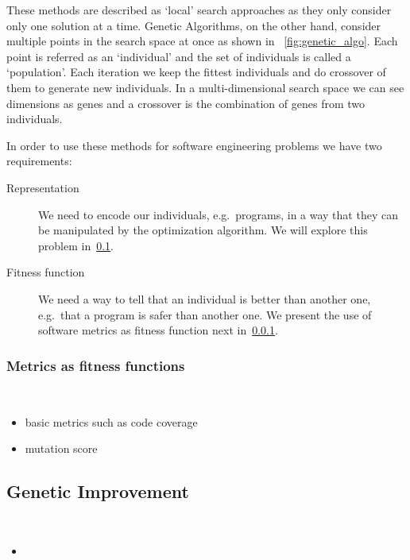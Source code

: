 \documentclass[11pt]{sdm}
\newcommand{\todo}[1]{\colorbox{Red!75}{\textcolor{white}{\textbf{TODO\ifx&#1&\else: #1\fi}}}}
\begin{document}
These methods are described as `local' search approaches as they only consider only one solution at a time.
Genetic Algorithms, on the other hand, consider multiple points in the search space at once as shown in \figurename~\ref{fig:genetic_algo}.
Each point is referred as an `individual' and the set of individuals is called a `population'.
Each iteration we keep the fittest individuals and do crossover of them to generate new individuals.
In a multi-dimensional search space we can see dimensions as genes and a crossover is the combination of genes from two individuals.

In order to use these methods for software engineering problems we have two requirements:
\begin{description}
  \item[Representation] We need to encode our individuals, e.g.\ programs, in a way that they can be manipulated by the optimization algorithm. We will explore this problem in~\ref{applications}.
  \item[Fitness function] We need a way to tell that an individual is better than another one, e.g.\ that a program is safer than another one. We present the use of software metrics as fitness function next in~\ref{fitness_func}.
\end{description}

\subsubsection{Metrics as fitness functions}
\label{fitness_func}
\todo{}

\begin{itemize}
  \item basic metrics such as code coverage
  \item mutation score
\end{itemize}

\subsection{Genetic Improvement}
\label{applications}
\todo{}

\begin{itemize}
  \item
\end{itemize}

\cite{petke2017genetic}

\end{document}
